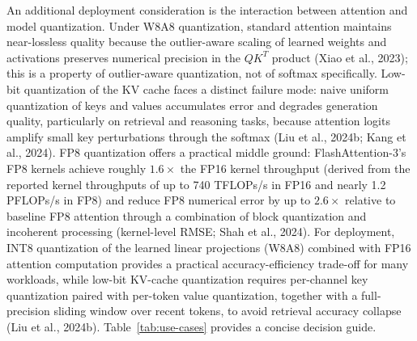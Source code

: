 \documentclass[10pt,twocolumn]{article}
\begin{document}
An additional deployment consideration is the interaction between attention and model quantization. Under W8A8 quantization, standard attention maintains near-lossless quality because the outlier-aware scaling of learned weights and activations preserves numerical precision in the $QK^T$ product (Xiao et al., 2023); this is a property of outlier-aware quantization, not of softmax specifically. Low-bit quantization of the KV cache faces a distinct failure mode: naive uniform quantization of keys and values accumulates error and degrades generation quality, particularly on retrieval and reasoning tasks, because attention logits amplify small key perturbations through the softmax (Liu et al., 2024b; Kang et al., 2024). FP8 quantization offers a practical middle ground: FlashAttention-3's FP8 kernels achieve roughly $1.6\times$ the FP16 kernel throughput (derived from the reported kernel throughputs of up to 740 TFLOPs/s in FP16 and nearly 1.2 PFLOPs/s in FP8) and reduce FP8 numerical error by up to $2.6\times$ relative to baseline FP8 attention through a combination of block quantization and incoherent processing (kernel-level RMSE; Shah et al., 2024). For deployment, INT8 quantization of the learned linear projections (W8A8) combined with FP16 attention computation provides a practical accuracy-efficiency trade-off for many workloads, while low-bit KV-cache quantization requires per-channel key quantization paired with per-token value quantization, together with a full-precision sliding window over recent tokens, to avoid retrieval accuracy collapse (Liu et al., 2024b). Table~\ref{tab:use-cases} provides a concise decision guide.
\end{document}
